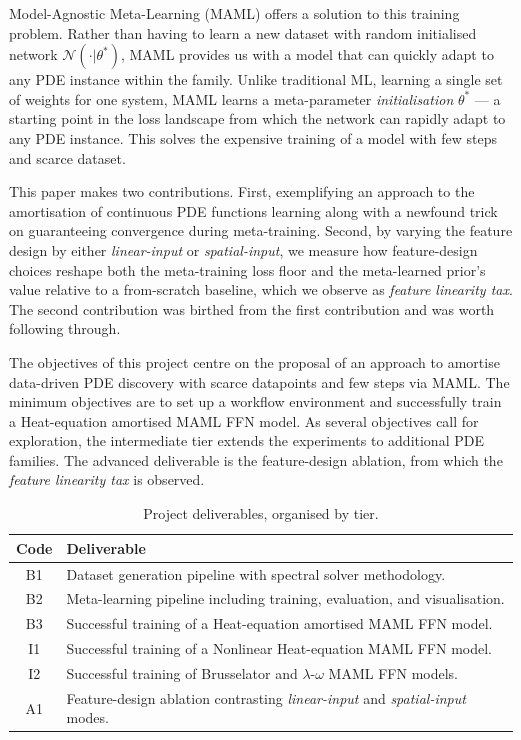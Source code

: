 \documentclass[10pt,journal,compsoc]{IEEEtran}
\begin{document}
Model-Agnostic Meta-Learning (MAML) \cite{finn2017} offers a solution to this
training problem. Rather than having to learn a new dataset with random
initialised network $\mathcal{N}(\cdot|\theta^*)$, MAML provides us with a model
that can quickly adapt to any PDE instance within the family. Unlike
traditional ML, learning a single set of weights for one system, MAML learns a
meta-parameter \emph{initialisation} $\theta^*$ --- a starting point in the
loss landscape from which the network can rapidly adapt to any PDE instance.
This solves the expensive training of a model with few steps and scarce
dataset.

This paper makes two contributions. First, exemplifying an approach to the
amortisation of continuous PDE functions learning along with a newfound trick
on guaranteeing convergence during meta-training. Second, by varying the
feature design by either \emph{linear-input} or \emph{spatial-input}, we
measure how feature-design choices reshape both the meta-training loss floor
and the meta-learned prior's value relative to a from-scratch baseline, which
we observe as \emph{feature linearity tax}. The second contribution was
birthed from the first contribution and was worth following through.

The objectives of this project centre on the proposal of an approach to
amortise data-driven PDE discovery with scarce datapoints and few steps via
MAML. The minimum objectives are to set up a workflow environment and
successfully train a Heat-equation amortised MAML FFN model. As several
objectives call for exploration, the intermediate tier extends the experiments
to additional PDE families. The advanced deliverable is the feature-design
ablation, from which the \emph{feature linearity tax} is observed.

\begin{table}[!t]
\renewcommand{\arraystretch}{1.3}
\caption{Project deliverables, organised by tier.}
\label{table_deliverables}
\centering
\begin{tabular}{c l}
\hline\hline
Code & Deliverable \\
\hline
B1 & Dataset generation pipeline with spectral solver methodology. \\
B2 & Meta-learning pipeline including training, evaluation, and visualisation. \\
B3 & Successful training of a Heat-equation amortised MAML FFN model. \\
I1 & Successful training of a Nonlinear Heat-equation MAML FFN model. \\
I2 & Successful training of Brusselator and $\lambda$-$\omega$ MAML FFN models. \\
A1 & Feature-design ablation contrasting \emph{linear-input} and \emph{spatial-input} modes. \\
\hline\hline
\end{tabular}
\end{table}
\end{document}
